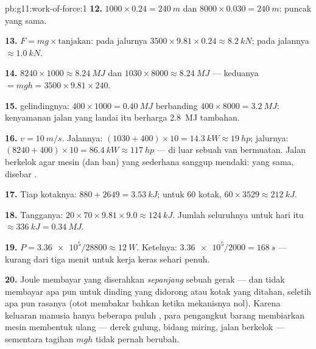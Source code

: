 \begin{solution}{pb:g11:work-of-force:1}
\textbf{12.} $1000 \times 0.24 = \qty{240}{m}$ dan
$8000 \times 0.030 = \qty{240}{m}$: puncak yang sama.

\textbf{13.} $F = mg \times \text{tanjakan}$: pada jalurnya
$3500 \times 9.81 \times 0.24 \approx \qty{8.2}{kN}$; pada jalannya
$\approx \qty{1.0}{kN}$.

\textbf{14.} $8240 \times 1000 \approx \qty{8.24}{MJ}$ dan
$1030 \times 8000 \approx \qty{8.24}{MJ}$ --- keduanya
$= mgh = 3500
\times 9.81 \times 240$.

\textbf{15.}  gelindingnya:
$400 \times 1000 = \qty{0.40}{MJ}$ berbanding
$400 \times 8000 = \qty{3.2}{MJ}$: kenyamanan jalan yang landai itu
berharga \qty{2.8}{MJ}  tambahan.

\textbf{16.} $v = \qty{10}{m/s}$. Jalannya:
$(1030 + 400) \times 10 = \qty{14.3}{kW} \approx \qty{19}{hp}$;
jalurnya: $(8240 + 400) \times 10 = \qty{86.4}{kW} \approx \qty{117}{hp}$ --- di luar  sebuah van bermuatan. Jalan
berkelok agar mesin (dan ban) yang sederhana sanggup mendaki: 
yang sama, disebar .

\textbf{17.} Tiap kotaknya: $880 + 2649 = \qty{3.53}{kJ}$; untuk $60$
kotak, $60 \times 3529 \approx \qty{212}{kJ}$.

\textbf{18.} Tangganya: $20 \times 70 \times 9.81 \times 9.0 \approx
\qty{124}{kJ}$. Jumlah seluruhnya untuk hari itu
$\approx \qty{336}{kJ} = \qty{0.34}{MJ}$.

\textbf{19.} $P = \num{3.36e5}/28800 \approx \qty{12}{W}$. Ketelnya:
$\num{3.36e5}/2000 = \qty{168}{s}$ --- kurang dari tiga menit untuk
kerja keras sehari penuh.

\textbf{20.} Joule membayar  yang diserahkan \emph{sepanjang}
sebuah gerak --- dan tidak membayar apa pun untuk dinding yang didorong
atau kotak yang ditahan, seletih apa pun rasanya (otot membakar  bahkan ketika  mekanisnya nol). Karena keluaran  manusia
hanya beberapa puluh , para pengangkut barang membiarkan mesin
membentuk ulang  --- derek gulung, bidang miring, jalan berkelok
--- sementara tagihan $mgh$ tidak pernah berubah.
\end{solution}
